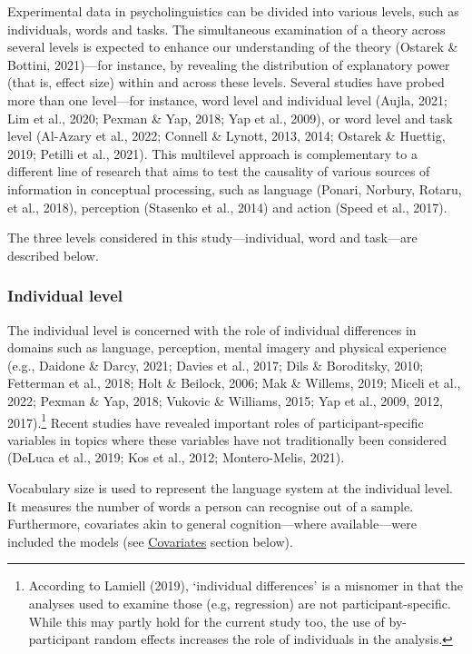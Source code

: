 \documentclass[
  12pt,
  man,floatsintext]{apa7}
\begin{document}
Experimental data in psycholinguistics can be divided into various levels, such as individuals, words and tasks. The simultaneous examination of a theory across several levels is expected to enhance our understanding of the theory (Ostarek \& Bottini, 2021)---for instance, by revealing the distribution of explanatory power (that is, effect size) within and across these levels. Several studies have probed more than one level---for instance, word level and individual level (Aujla, 2021; Lim et al., 2020; Pexman \& Yap, 2018; Yap et al., 2009), or word level and task level (Al-Azary et al., 2022; Connell \& Lynott, 2013, 2014; Ostarek \& Huettig, 2019; Petilli et al., 2021). This multilevel approach is complementary to a different line of research that aims to test the causality of various sources of information in conceptual processing, such as language (Ponari, Norbury, Rotaru, et al., 2018), perception (Stasenko et al., 2014) and action (Speed et al., 2017).

The three levels considered in this study---individual, word and task---are described below.

\hypertarget{individual-level}{%
\subsubsection{Individual level}\label{individual-level}}

The individual level is concerned with the role of individual differences in domains such as language, perception, mental imagery and physical experience (e.g., Daidone \& Darcy, 2021; Davies et al., 2017; Dils \& Boroditsky, 2010; Fetterman et al., 2018; Holt \& Beilock, 2006; Mak \& Willems, 2019; Miceli et al., 2022; Pexman \& Yap, 2018; Vukovic \& Williams, 2015; Yap et al., 2009, 2012, 2017).\footnote{According to Lamiell (2019), `individual differences' is a misnomer in that the analyses used to examine those (e.g, regression) are not participant-specific. While this may partly hold for the current study too, the use of by-participant random effects increases the role of individuals in the analysis.} Recent studies have revealed important roles of participant-specific variables in topics where these variables have not traditionally been considered (DeLuca et al., 2019; Kos et al., 2012; Montero-Melis, 2021).

Vocabulary size is used to represent the language system at the individual level. It measures the number of words a person can recognise out of a sample. Furthermore, covariates akin to general cognition---where available---were included the models (see \protect\hyperlink{covariates}{\underline{Covariates}} section below).
\end{document}
